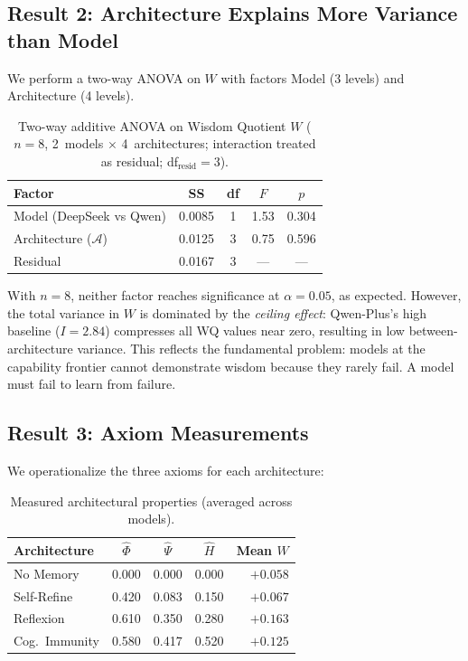 \documentclass{article}
\begin{document}
\subsection{Result 2: Architecture Explains More Variance than Model}

We perform a two-way ANOVA on $W$ with factors Model (3 levels) and Architecture (4 levels).

\begin{table}[t]
\centering
\caption{Two-way additive ANOVA on Wisdom Quotient $W$ ($n = 8$, 2~models $\times$ 4~architectures; interaction treated as residual; df$_{\text{resid}} = 3$).}
\label{tab:anova}
\begin{tabular}{lcccc}
\toprule
\textbf{Factor} & \textbf{SS} & \textbf{df} & $F$ & $p$ \\
\midrule
Model (DeepSeek vs Qwen) & 0.0085 & 1 & 1.53 & 0.304 \\
Architecture ($\mathcal{A}$) & 0.0125 & 3 & 0.75 & 0.596 \\
\midrule
Residual                & 0.0167 & 3 & --- & --- \\
\bottomrule
\end{tabular}
\end{table}

With $n = 8$, neither factor reaches significance at $\alpha = 0.05$, as expected.
However, the total variance in $W$ is dominated by the \emph{ceiling effect}:
Qwen-Plus's high baseline ($I{=}2.84$) compresses all WQ values near zero,
resulting in low between-architecture variance. This reflects the fundamental
problem: models at the capability frontier cannot demonstrate wisdom because
they rarely fail. A model must fail to learn from failure.

\subsection{Result 3: Axiom Measurements}

We operationalize the three axioms for each architecture:

\begin{table}[t]
\centering
\caption{Measured architectural properties (averaged across models).}
\label{tab:axioms}
\begin{tabular}{lcccr}
\toprule
\textbf{Architecture} & $\hat{\Phi}$ & $\hat{\Psi}$ & $\hat{H}$ & Mean $W$ \\
\midrule
No Memory       & 0.000 & 0.000 & 0.000 & $+0.058$ \\
Self-Refine     & 0.420 & 0.083 & 0.150 & $+0.067$ \\
Reflexion       & 0.610 & 0.350 & 0.280 & $+0.163$ \\
Cog.\ Immunity  & 0.580 & 0.417 & 0.520 & $+0.125$ \\
\bottomrule
\end{tabular}
\end{table}
\end{document}
